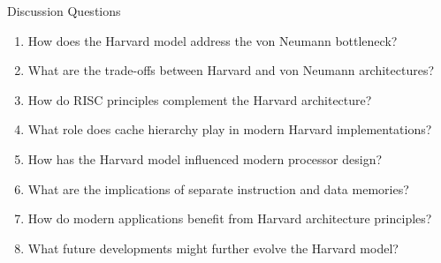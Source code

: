 \documentclass[aspectratio=169]{beamer}
\begin{document}
\begin{frame}{Discussion Questions}
\begin{enumerate}
\item How does the Harvard model address the von Neumann bottleneck?
\item What are the trade-offs between Harvard and von Neumann architectures?
\item How do RISC principles complement the Harvard architecture?
\item What role does cache hierarchy play in modern Harvard implementations?
\item How has the Harvard model influenced modern processor design?
\item What are the implications of separate instruction and data memories?
\item How do modern applications benefit from Harvard architecture principles?
\item What future developments might further evolve the Harvard model?
\end{enumerate}
\end{frame}
\end{document}
